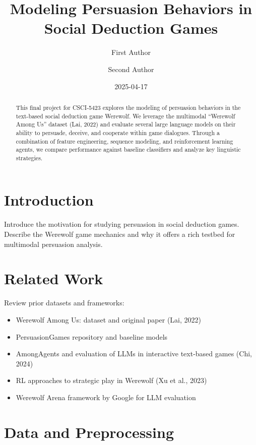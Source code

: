\documentclass[
  letterpaper,
  DIV=11,
  numbers=noendperiod]{scrreprt}
\title{Modeling Persuasion Behaviors in Social Deduction Games}
\author{First Author \and Second Author}
\date{2025-04-17}
\providecommand{\tightlist}{%
  \setlength{\itemsep}{0pt}\setlength{\parskip}{0pt}}\usepackage{longtable,booktabs,array}
\renewcommand*\contentsname{Table of contents}
\newcommand\contentsname{Table of contents}
\begin{document}
\maketitle
\begin{abstract}
This final project for CSCI‑5423 explores the modeling of persuasion
behaviors in the text-based social deduction game Werewolf. We leverage
the multimodal ``Werewolf Among Us'' dataset (Lai, 2022) and evaluate
several large language models on their ability to persuade, deceive, and
cooperate within game dialogues. Through a combination of feature
engineering, sequence modeling, and reinforcement learning agents, we
compare performance against baseline classifiers and analyze key
linguistic strategies.
\end{abstract}

\renewcommand*\contentsname{Table of contents}
{
\hypersetup{linkcolor=}
\setcounter{tocdepth}{2}
\tableofcontents
}

\chapter{Introduction}\label{introduction}

Introduce the motivation for studying persuasion in social deduction
games. Describe the Werewolf game mechanics and why it offers a rich
testbed for multimodal persuasion analysis.

\chapter{Related Work}\label{related-work}

Review prior datasets and frameworks:

\begin{itemize}
\tightlist
\item
  Werewolf Among Us: dataset and original paper (Lai, 2022)
\item
  PersuasionGames repository and baseline models
\item
  AmongAgents and evaluation of LLMs in interactive text-based games
  (Chi, 2024)
\item
  RL approaches to strategic play in Werewolf (Xu et al., 2023)
\item
  Werewolf Arena framework by Google for LLM evaluation
\end{itemize}

\chapter{Data and Preprocessing}\label{data-and-preprocessing}
\end{document}
